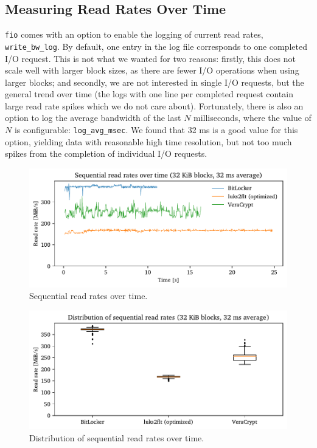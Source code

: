 \subsection{Measuring Read Rates Over Time}
\label{chap:performance.hwexperiments.readrateovertime}
\texttt{fio} comes with an option to enable the logging of current read rates, \texttt{write\_bw\_log}. By default, one entry in the log file corresponds to one completed I/O request. This is not what we wanted for two reasons: firstly, this does not scale well with larger block sizes, as there are fewer I/O operations when using larger blocks; and secondly, we are not interested in single I/O requests, but the general trend over time (the logs with one line per completed request contain large read rate spikes which we do not care about). Fortunately, there is also an option to log the average bandwidth of the last $N$ milliseconds, where the value of $N$ is configurable: \texttt{log\_avg\_msec}. We found that 32 ms is a good value for this option, yielding data with reasonable high time resolution, but not too much spikes from the completion of individual I/O requests.

\begin{figure}[htb!]
	\center
	\includegraphics[scale=1]{../fig/performance.hwexperiments.seqovertime.pdf}
	\caption[
		Sequential read rates over time
	]{
		Sequential read rates over time.  
	}
	\label{fig:performance.hwexperiments.seqovertime}
\end{figure}

\begin{figure}[htb!]
	\center
	\includegraphics[scale=1]{../fig/performance.hwexperiments.seqovertimebox.pdf}
	\caption[
		Distribution of sequential read rates over time
	]{
		Distribution of sequential read rates over time.  
	}
	\label{fig:performance.hwexperiments.seqovertimebox}
\end{figure}

